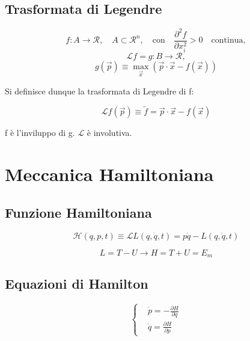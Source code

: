 \documentclass{article}
\begin{document}
            \subsection{Trasformata di Legendre}

            \[
                f: A \rightarrow \mathcal{R}, \quad A \subset \mathcal{R}^n, \quad \text{con} \quad \frac{\partial ^2 f}{\partial x_i^2}>0 \quad \text{continua},
            \]
            \[
                \mathcal{L}f = g: B \rightarrow \mathcal{R},
            \]
            \[
                g(\vec{p}) \equiv \max_{\vec{x}} (\vec{p} \cdot \vec{x} - f(\vec{x}))
            \]

            Si definisce dunque la trasformata di Legendre di f:

            \[
                \mathcal{L}f(\vec{p})\equiv \tilde{f}= \vec{p} \cdot \vec{x} - f(\vec{x})
            \]

            f è l'inviluppo di g.
        $\mathcal{L}$ è involutiva.


            \section{Meccanica Hamiltoniana}

            \subsection{Funzione Hamiltoniana}

            \begin{equation}
                \mathcal{H}(q,p, t)\equiv \mathcal{L}L(q,\dot q, t)= p\dot q- L(q,\dot q, t)
            \end{equation}

            \begin{equation}
                L=T-U \rightarrow H= T+U= E_m
            \end{equation}

            \subsection{Equazioni di Hamilton}
            \begin{equation}
                \left\{
                \begin{aligned}
                     & \dot p=-\frac{\partial H}{\partial q} \\
                     & \dot q= \frac{\partial H}{\partial p}
                \end{aligned}
                \right.
            \end{equation}
\end{document}
